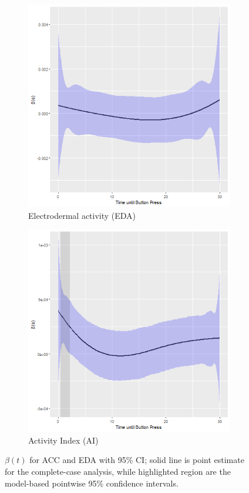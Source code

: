 \documentclass[12pt]{amsart}
\begin{document}
\begin{figure}[!th]
\centering
\begin{subfigure}{.5\textwidth}
  \centering
  \includegraphics[width=.8\linewidth]{../figures/eda_coef_joint.png}
  \caption{Electrodermal activity (EDA)}
  \label{fig:eda_estimate}
\end{subfigure}%
\begin{subfigure}{.5\textwidth}
  \centering
  \includegraphics[width=.8\linewidth]{../figures/acc_coef_joint.png}
  \caption{Activity Index (AI)
}  \label{fig:acc_estimate}
\end{subfigure}
\caption{$\beta (t)$ for ACC and EDA with 95\% CI; solid line is point estimate for the complete-case analysis, while highlighted region are the model-based pointwise 95\% confidence intervals.}
\label{fig:edacc_estimate}
\end{figure}
\end{document}
